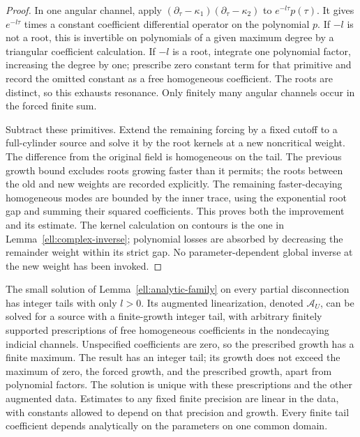 \begin{proof}
In one angular channel, apply
$(\partial_\tau-\kappa_1)(\partial_\tau-\kappa_2)$ to
$e^{-l\tau}p(\tau)$.  It gives $e^{-l\tau}$ times a constant
coefficient differential operator on the polynomial $p$.
If $-l$ is not a root, this is invertible on polynomials of a
given maximum degree by a triangular coefficient calculation.
If $-l$ is a root, integrate one polynomial factor, increasing
the degree by one; prescribe zero constant term for that
primitive and record the omitted constant as a free homogeneous
coefficient.  The roots are distinct, so this exhausts resonance.
Only finitely many angular channels occur in the forced finite sum.

Subtract these primitives.  Extend the remaining forcing by a
fixed cutoff to a full-cylinder source and solve it by the root
kernels at a new noncritical weight.  The difference from the
original field is homogeneous on the tail.  The previous growth
bound excludes roots growing faster than it permits; the roots
between the old and new weights are recorded explicitly.  The
remaining faster-decaying homogeneous modes are bounded by
the inner trace, using the exponential root gap and summing
their squared coefficients.  This proves both the improvement
and its estimate.  The kernel calculation on contours is the
one in Lemma~\ref{ell:complex-inverse}; polynomial losses are
absorbed by decreasing the remainder weight within its strict
gap.  No parameter-dependent global inverse at the new weight
has been invoked.
\end{proof}

\begin{lemma}
\label{ell:prescribed-tails}
The small solution of Lemma~\ref{ell:analytic-family} on every
partial disconnection has integer tails with only $l>0$.
Its augmented linearization, denoted $\mathcal A_U$, can be
solved for a source with a finite-growth integer tail, with
arbitrary finitely supported prescriptions of free homogeneous
coefficients in the nondecaying indicial channels. Unspecified
coefficients are zero, so the prescribed growth has a finite maximum.
The result has an integer tail; its growth does not exceed the
maximum of zero, the forced growth, and the prescribed growth,
apart from polynomial factors.  The solution is unique with
these prescriptions and the other augmented data.  Estimates
to any fixed finite precision are linear in the data, with
constants allowed to depend on that precision and growth.
Every finite tail coefficient depends analytically on the
parameters on one common domain.
\end{lemma}

